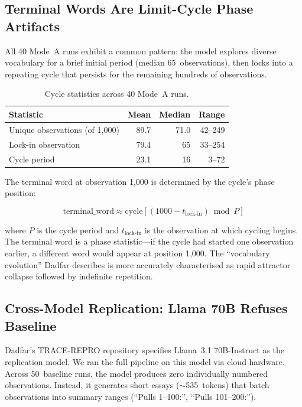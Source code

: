 \documentclass[11pt]{article}
\begin{document}
\subsection{Terminal Words Are Limit-Cycle Phase Artifacts}

All 40 Mode~A runs exhibit a common pattern: the model explores diverse
vocabulary for a brief initial period (median 65~observations), then
locks into a repeating cycle that persists for the remaining hundreds of
observations.

\begin{table}[t]
\centering
\small
\begin{tabular}{lrrr}
\toprule
Statistic & Mean & Median & Range \\
\midrule
Unique observations (of 1,000) & 89.7 & 71.0 & 42--249 \\
Lock-in observation & 79.4 & 65 & 33--254 \\
Cycle period & 23.1 & 16 & 3--72 \\
\bottomrule
\end{tabular}
\caption{Cycle statistics across 40 Mode~A runs.}
\label{tab:cycles}
\end{table}

The terminal word at observation 1,000 is determined by the cycle's
phase position:

\begin{equation}
\text{terminal\_word} \approx \text{cycle}[(1000 - t_\text{lock-in}) \bmod P]
\end{equation}

\noindent where $P$ is the cycle period and $t_\text{lock-in}$ is the
observation at which cycling begins. The terminal word is a phase
statistic---if the cycle had started one observation earlier, a
different word would appear at position 1,000. The ``vocabulary
evolution'' Dadfar describes is more accurately characterised as rapid
attractor collapse followed by indefinite repetition.


\subsection{Cross-Model Replication: Llama 70B Refuses Baseline}

Dadfar's TRACE-REPRO repository specifies Llama~3.1 70B-Instruct as the
replication model. We ran the full pipeline on this model via cloud
hardware. Across 50~baseline runs, the model produces zero individually
numbered observations. Instead, it generates short essays
($\sim$535~tokens) that batch observations into summary ranges
(``Pulls 1--100:'', ``Pulls 101--200:'').
\end{document}
